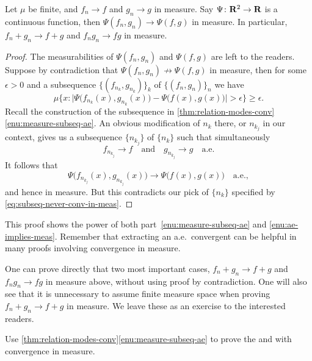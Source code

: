 \begin{cor}
    Let $\mu$ be finite, and $f_n \to f$ and $g_n \to g$ in measure. Say $\Psi\colon \mathbf{R}^2 \to \mathbf{R}$ is a continuous function, then $\Psi(f_n,g_n) \to \Psi(f,g)$ in measure. In particular, $f_n + g_n \to f + g$ and $f_n g_n \to fg$ in measure.
\end{cor}
\begin{proof}
    The measurabilities of $\Psi(f_n,g_n)$ and $\Psi(f,g)$ are left to the readers. Suppose by contradiction that $\Psi(f_n,g_n) \not\to \Psi(f,g)$ in measure, then for some $\epsilon > 0$ and a subsequence $\{(f_{n_k},g_{n_k})\}_k$ of $\{(f_n,g_n)\}_n$ we have \begin{equation}
        \mu\bigl\{x: \bigl\vert\Psi\bigl(f_{n_k}(x),g_{n_k}(x)\bigr) - \Psi\bigl(f(x),g(x)\bigr)\bigr\vert > \epsilon \bigr\} \geq\epsilon. \label{eq:subseq-never-conv-in-meas}
    \end{equation} Recall the construction of the subsequence in \cref{thm:relation-modes-conv}\ref{enu:measure-subseq-ae}. An obvious modification of $n_k$ there, or $n_{k_j}$ in our context, gives us a subsequence $\{n_{k_j}\}$ of $\{n_k\}$ such that simultaneously \[
        f_{n_{k_j}} \to f \quad \text{and} \quad g_{n_{k_j}} \to g\quad\text{a.e.}
    \] It follows that \[
        \Psi\bigl(f_{n_{k_j}}(x),g_{n_{k_j}}(x)\bigr) \to  \Psi\bigl(f(x),g(x)\bigr) \quad\text{a.e.},
    \] and hence in measure. But this contradicts our pick of $\{n_k\}$ specified by \eqref{eq:subseq-never-conv-in-meas}.
\end{proof}

This proof shows the power of both part~\ref{enu:measure-subseq-ae} and \ref{enu:ae-implies-meas}. Remember that extracting an a.e.\ convergent can be helpful in many proofs involving convergence in measure.

\begin{rem}
    One can prove directly that two most important cases, $f_n + g_n \to f+g$ and $f_ng_n \to fg$ in measure above, without using proof by contradiction. One will also see that it is unnecessary to assume finite measure space when proving $f_n + g_n \to f + g$ in measure. We leave these as an exercise to the interested readers.
\end{rem}

\begin{xca}
Use \cref{thm:relation-modes-conv}\ref{enu:measure-subseq-ae} to prove the  and  with convergence in measure.
\end{xca}

